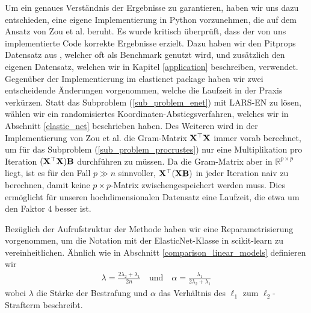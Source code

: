 Um ein genaues Verständnis der Ergebnisse zu garantieren, haben wir uns dazu entschieden, eine eigene Implementierung in Python vorzunehmen, die auf dem Ansatz von Zou et al. beruht. Es wurde kritisch überprüft, dass der von uns implementierte Code korrekte Ergebnisse erzielt. Dazu haben  wir den Pitprops Datensatz aus \cite{zou_sparsepca}, welcher oft als Benchmark genutzt wird, und zusätzlich den eigenen Datensatz, welchen wir in Kapitel \ref{application} beschreiben, verwendet. Gegenüber der Implementierung im elasticnet package haben wir zwei entscheidende Änderungen vorgenommen, welche die Laufzeit in der Praxis verkürzen. Statt das Subproblem (\ref{sub_problem_enet}) mit LARS-EN zu lösen, wählen wir ein randomisiertes Koordinaten-Abstiegsverfahren, welches wir in Abschnitt \ref{elastic_net} beschrieben haben. Des Weiteren wird in der Implementierung von Zou et al. die Gram-Matrix $\mathbf{X}^{\top} \mathbf{X}$ immer vorab berechnet, um für das Subproblem (\ref{sub_problem_procrustes}) nur eine Multiplikation pro Iteration $(\mathbf{X}^{\top} \mathbf{X}) \mathbf{B}$ durchführen zu müssen. Da die Gram-Matrix aber in $\mathbb{R}^{p \times p}$ liegt, ist es für den Fall $p \gg n$ sinnvoller, $\mathbf{X}^{\top} (\mathbf{X} \mathbf{B})$ in jeder Iteration naiv zu berechnen, damit keine $p \times p$-Matrix zwischengespeichert werden muss. Dies ermöglicht für unseren hochdimensionalen Datensatz eine Laufzeit, die etwa um den Faktor $4$ besser ist.

Bezüglich der Aufrufstruktur der Methode haben wir eine Reparametrisierung vorgenommen, um die Notation mit der ElasticNet-Klasse in scikit-learn zu vereinheitlichen. Ähnlich wie in Abschnitt \ref{comparison_linear_models} definieren wir
\begin{align}
\lambda = \frac{2\lambda_2 + \lambda_1}{2n} \quad \text{und} \quad \alpha = \frac{\lambda_1}{2\lambda_2 + \lambda_1}
\end{align}
wobei $\lambda$ die Stärke der Bestrafung und $\alpha$ das Verhältnis des $\ell_1$ zum $\ell_2$-Strafterm beschreibt.